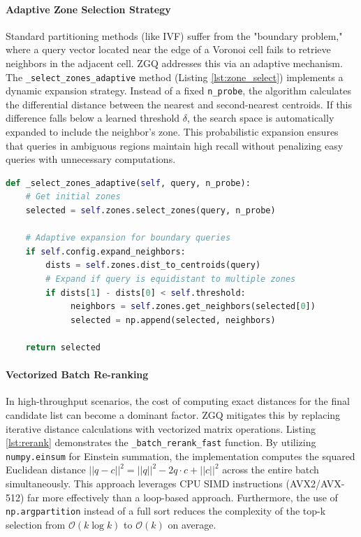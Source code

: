 \documentclass[conference]{IEEEtran}
\begin{document}
\paragraph{Adaptive Zone Selection Strategy}
Standard partitioning methods (like IVF) suffer from the "boundary problem," where a query vector located near the edge of a Voronoi cell fails to retrieve neighbors in the adjacent cell. ZGQ addresses this via an adaptive mechanism.
The \texttt{\_select\_zones\_adaptive} method (Listing \ref{lst:zone_select}) implements a dynamic expansion strategy. Instead of a fixed \texttt{n\_probe}, the algorithm calculates the differential distance between the nearest and second-nearest centroids. If this difference falls below a learned threshold $\delta$, the search space is automatically expanded to include the neighbor's zone. This probabilistic expansion ensures that queries in ambiguous regions maintain high recall without penalizing easy queries with unnecessary computations.

\begin{lstlisting}[language=Python, caption=Adaptive Zone Selection Logic, label=lst:zone_select]
def _select_zones_adaptive(self, query, n_probe):
    # Get initial zones
    selected = self.zones.select_zones(query, n_probe)
    
    # Adaptive expansion for boundary queries
    if self.config.expand_neighbors:
        dists = self.zones.dist_to_centroids(query)
        # Expand if query is equidistant to multiple zones
        if dists[1] - dists[0] < self.threshold:
             neighbors = self.zones.get_neighbors(selected[0])
             selected = np.append(selected, neighbors)
             
    return selected
\end{lstlisting}

\paragraph{Vectorized Batch Re-ranking}
In high-throughput scenarios, the cost of computing exact distances for the final candidate list can become a dominant factor. ZGQ mitigates this by replacing iterative distance calculations with vectorized matrix operations.
Listing \ref{lst:rerank} demonstrates the \texttt{\_batch\_rerank\_fast} function. By utilizing \texttt{numpy.einsum} for Einstein summation, the implementation computes the squared Euclidean distance $||q - c||^2 = ||q||^2 - 2q \cdot c + ||c||^2$ across the entire batch simultaneously. This approach leverages CPU SIMD instructions (AVX2/AVX-512) far more effectively than a loop-based approach. Furthermore, the use of \texttt{np.argpartition} instead of a full sort reduces the complexity of the top-k selection from $\mathcal{O}(k \log k)$ to $\mathcal{O}(k)$ on average.
\end{document}
